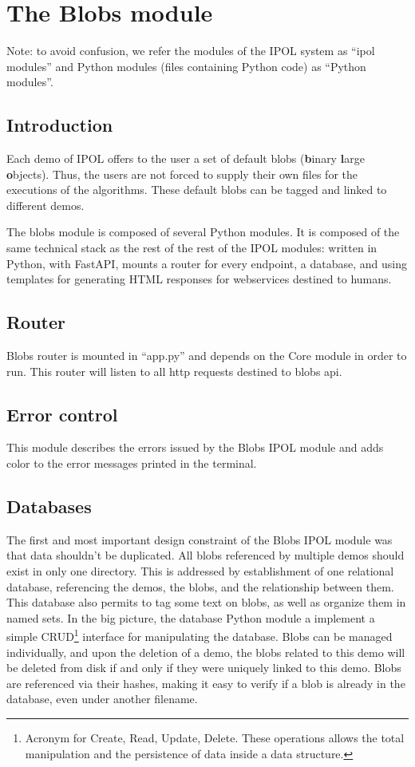 \section{The Blobs module}

Note: to avoid confusion, we refer the modules of the IPOL system as ``ipol modules'' and Python modules (files containing Python code) as ``Python modules''.

\subsection{Introduction}
Each demo of IPOL offers to the user a set of default blobs (\textbf{b}inary \textbf{l}arge \textbf{o}bjects). Thus, the users are not forced to supply their own files for the executions of the algorithms. These default blobs can be tagged and linked to different demos.

The blobs module is composed of several Python modules. It is composed of the same technical stack as the rest of the rest of the IPOL modules: written in Python, with FastAPI, mounts a router for every endpoint, a database, and using templates for generating HTML responses for webservices destined to humans.

\subsection{Router}
Blobs router is mounted in ``app.py'' and depends on the Core module in order to run. This router will listen to all http requests  destined to blobs api.

\subsection{Error control}
This module describes the errors issued by the Blobs IPOL module and adds color to the error messages printed in the terminal.

\subsection{Databases}
The first and most important design constraint of the Blobs IPOL module was that data shouldn't be duplicated. All blobs referenced by multiple demos should exist in only one directory. This is addressed by establishment of one relational database, referencing the demos, the blobs, and the relationship between them. This database also permits to tag some text on blobs, as well as organize them in named sets. In the big picture, the database Python module a implement a simple CRUD\footnote{Acronym for Create, Read, Update, Delete. These operations allows the total manipulation and the persistence of data inside a data structure.} interface for manipulating the database. Blobs can be managed individually, and upon the deletion of a demo, the blobs related to this demo will be deleted from disk if and only if they were uniquely linked to this demo. Blobs are referenced via their hashes, making it easy to verify if a blob is already in the database, even under another filename. \\

